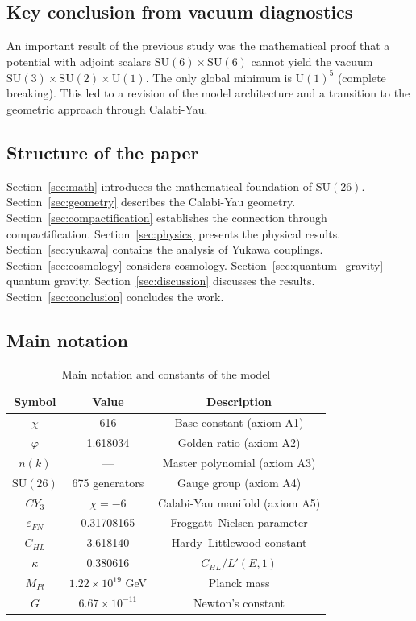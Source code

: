 \documentclass[12pt,a4paper,twoside]{article}
\newcommand{\SU}{\mathrm{SU}}
\newcommand{\Uone}{\mathrm{U}(1)}
\newcommand{\EPS}{\varepsilon}
\theoremstyle{definition}
\begin{document}
\subsection{Key conclusion from vacuum diagnostics}

An important result of the previous study \cite{Matershov:2026f} was the mathematical proof that a potential with adjoint scalars $\SU(6) \times \SU(6)$ cannot yield the vacuum $\SU(3) \times \SU(2) \times \Uone$. The only global minimum is $\Uone^5$ (complete breaking). This led to a revision of the model architecture and a transition to the geometric approach through Calabi-Yau.

\subsection{Structure of the paper}

Section~\ref{sec:math} introduces the mathematical foundation of $\SU(26)$. Section~\ref{sec:geometry} describes the Calabi-Yau geometry. Section~\ref{sec:compactification} establishes the connection through compactification. Section~\ref{sec:physics} presents the physical results. Section~\ref{sec:yukawa} contains the analysis of Yukawa couplings. Section~\ref{sec:cosmology} considers cosmology. Section~\ref{sec:quantum_gravity} — quantum gravity. Section~\ref{sec:discussion} discusses the results. Section~\ref{sec:conclusion} concludes the work.

\subsection{Main notation}

\begin{table}[H]
\centering
\small
\caption{Main notation and constants of the model}
\label{tab:notations}
\begin{tabular}{c|c|c}
\toprule
\textbf{Symbol} & \textbf{Value} & \textbf{Description} \\
\midrule
$\chi$ & 616 & Base constant (axiom A1) \\
$\varphi$ & 1.618034 & Golden ratio (axiom A2) \\
$n(k)$ & — & Master polynomial (axiom A3) \\
$\SU(26)$ & 675 generators & Gauge group (axiom A4) \\
$CY_3$ & $\chi = -6$ & Calabi-Yau manifold (axiom A5) \\
$\EPS_{FN}$ & 0.31708165 & Froggatt--Nielsen parameter \\
$C_{HL}$ & 3.618140 & Hardy--Littlewood constant \\
$\kappa$ & 0.380616 & $C_{HL} / L'(E,1)$ \\
$M_{Pl}$ & $1.22 \times 10^{19}$ GeV & Planck mass \\
$G$ & $6.67 \times 10^{-11}$ & Newton's constant \\
\bottomrule
\end{tabular}
\end{table}
\end{document}
